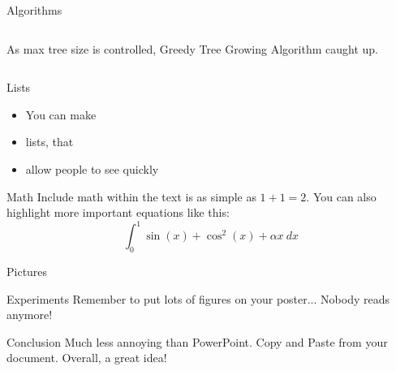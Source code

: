 \documentclass[serif,mathserif,final]{beamer}
\begin{document}
\begin{frame}{}
\begin{columns}[t]
\begin{column}{0.49\linewidth}
\begin{block}{\Huge Algorithms}
\begin{columns}[t]
\begin{column}{0.49\linewidth}
{					As max tree size is controlled,
					Greedy Tree Growing Algorithm caught up.
				}
			\end{column}
		\end{columns}

      \end{block}

      \begin{block}{Lists}
        \begin{itemize}
          \item You can make
          \item lists, that
          \item allow people to see quickly
        \end{itemize}
      \end{block}

      \begin{block}{Math}
        Include math within the text is as simple as $1+1=2$.  You can also
        highlight more important equations like this:
        \begin{equation*}
          \int_0^1\sin(x)+\cos^2(x)+\alpha x~d\!x
        \end{equation*}
      \end{block}


      \begin{block}{Pictures}
        \begin{figure}[htb]
          \centering
        \end{figure}
      \end{block}

      \begin{block}{Experiments}
        Remember to put lots of figures on your poster... Nobody reads anymore!
      \end{block}

      \begin{block}{Conclusion}
        Much less annoying than PowerPoint.  Copy and Paste from your
        document. Overall, a great idea!
      \end{block}

    \end{column}%

% 

  \end{columns}
\end{frame}
\end{document}
